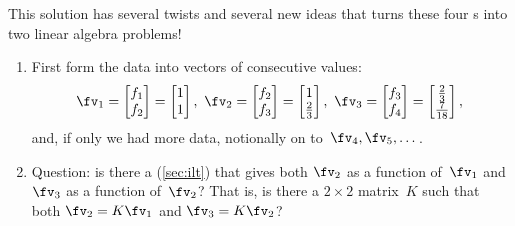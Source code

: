 \begin{example}
\begin{solution} 
This solution has several twists and several new ideas that turns these four s into two linear algebra problems!
\begin{enumerate}
\item First form the data into vectors of consecutive values:
\begin{equation*}
\fv_1=\begin{bmatrix} f_1\\f_2 \end{bmatrix}
=\begin{bmatrix} 1\\1 \end{bmatrix},\ 
\fv_2=\begin{bmatrix} f_2\\f_3 \end{bmatrix}
=\begin{bmatrix} 1\\\frac23 \end{bmatrix},\ 
\fv_3=\begin{bmatrix} f_3\\f_4 \end{bmatrix}
=\begin{bmatrix} \frac23\\\frac7{18} \end{bmatrix},\ 
\end{equation*}
and, if only we had more data, notionally on to~\(\fv_4,\fv_5,\ldots\)\,.
\item\label{eg:2expfitb}
Question: is there a  (\autoref{sec:ilt}) that gives both \(\fv_2\) as a function of~\(\fv_1\) and \(\fv_3\) as a function of~\(\fv_2\)?  
That is, is there a \(2\times2\) matrix~\(K\) such that both \(\fv_2=K\fv_1\) and \(\fv_3=K\fv_2\)?


\end{enumerate}
\end{solution}
\end{example}
